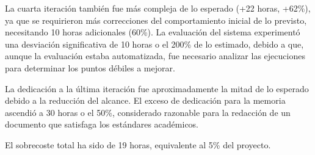 La cuarta iteración también fue más compleja de lo esperado (+22 horas, +62\%), ya que se requirieron más correcciones del comportamiento inicial de lo previsto, necesitando 10 horas adicionales (60\%). La evaluación del sistema experimentó una desviación significativa de 10 horas o el 200\% de lo estimado, debido a que, aunque la evaluación estaba automatizada, fue necesario analizar las ejecuciones para determinar los puntos débiles a mejorar.

La dedicación a la última iteración fue aproximadamente la mitad de lo esperado debido a la reducción del alcance. El exceso de dedicación para la memoria ascendió a 30 horas o el 50\%, considerado razonable para la redacción de un documento que satisfaga los estándares académicos.

El sobrecoste total ha sido de 19 horas, equivalente al 5\% del proyecto.

